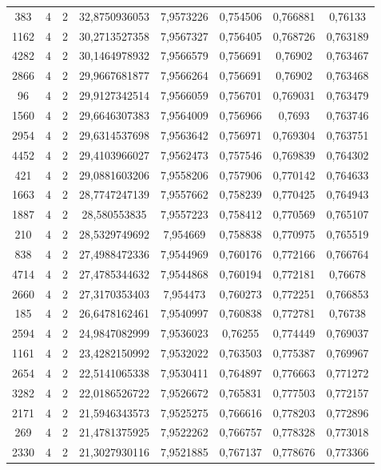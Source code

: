 \begin{longtable}{|c|c|c|c|c|c|c|c|}
383 & 4 & 2 & 32,8750936053 & 7,9573226 & 0,754506 & 0,766881 & 0,76133 \\
1162 & 4 & 2 & 30,2713527358 & 7,9567327 & 0,756405 & 0,768726 & 0,763189 \\
4282 & 4 & 2 & 30,1464978932 & 7,9566579 & 0,756691 & 0,76902 & 0,763467 \\
2866 & 4 & 2 & 29,9667681877 & 7,9566264 & 0,756691 & 0,76902 & 0,763468 \\
96 & 4 & 2 & 29,9127342514 & 7,9566059 & 0,756701 & 0,769031 & 0,763479 \\
1560 & 4 & 2 & 29,6646307383 & 7,9564009 & 0,756966 & 0,7693 & 0,763746 \\
2954 & 4 & 2 & 29,6314537698 & 7,9563642 & 0,756971 & 0,769304 & 0,763751 \\
4452 & 4 & 2 & 29,4103966027 & 7,9562473 & 0,757546 & 0,769839 & 0,764302 \\
421 & 4 & 2 & 29,0881603206 & 7,9558206 & 0,757906 & 0,770142 & 0,764633 \\
1663 & 4 & 2 & 28,7747247139 & 7,9557662 & 0,758239 & 0,770425 & 0,764943 \\
1887 & 4 & 2 & 28,580553835 & 7,9557223 & 0,758412 & 0,770569 & 0,765107 \\
210 & 4 & 2 & 28,5329749692 & 7,954669 & 0,758838 & 0,770975 & 0,765519 \\
838 & 4 & 2 & 27,4988472336 & 7,9544969 & 0,760176 & 0,772166 & 0,766764 \\
4714 & 4 & 2 & 27,4785344632 & 7,9544868 & 0,760194 & 0,772181 & 0,76678 \\
2660 & 4 & 2 & 27,3170353403 & 7,954473 & 0,760273 & 0,772251 & 0,766853 \\
185 & 4 & 2 & 26,6478162461 & 7,9540997 & 0,760838 & 0,772781 & 0,76738 \\
2594 & 4 & 2 & 24,9847082999 & 7,9536023 & 0,76255 & 0,774449 & 0,769037 \\
1161 & 4 & 2 & 23,4282150992 & 7,9532022 & 0,763503 & 0,775387 & 0,769967 \\
2654 & 4 & 2 & 22,5141065338 & 7,9530411 & 0,764897 & 0,776663 & 0,771272 \\
3282 & 4 & 2 & 22,0186526722 & 7,9526672 & 0,765831 & 0,777503 & 0,772157 \\
2171 & 4 & 2 & 21,5946343573 & 7,9525275 & 0,766616 & 0,778203 & 0,772896 \\
269 & 4 & 2 & 21,4781375925 & 7,9522262 & 0,766757 & 0,778328 & 0,773018 \\
2330 & 4 & 2 & 21,3027930116 & 7,9521885 & 0,767137 & 0,778676 & 0,773366 \\

\end{longtable}
